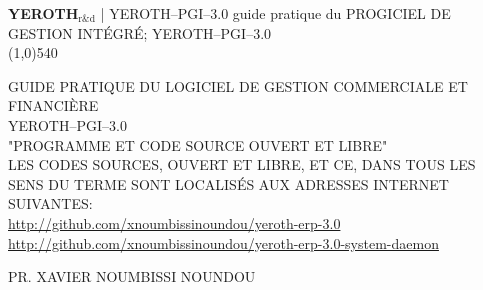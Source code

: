 \documentclass[a4paper, 12pt]{report}
\newcommand{\yerothrd}{\textcolor{yerothColorGreen}
			{\textsc{\textcolor{yerothColorRed}{YEROTH}}$_{\text{r\&d}}$\xspace}}
\newcommand{\yerothpgiblack}{YEROTH--PGI--$3.0$\xspace}
\newcommand{\yerothpgi}{\textsc{\textcolor{yerothColorBlue}{YEROTH--PGI--$3.0$}}\xspace}
\newcommand{\myfullacademicname}{PR. XAVIER NOUMBISSI NOUNDOU\xspace}
\begin{document}
\thispagestyle{OnlyFirstPage}

{\bf \Large \yerothrd} {| \sc \scriptsize \yerothpgiblack guide pratique du PROGICIEL
							DE GESTION INTÉGRÉ; YEROTH--PGI--3.0}
\\ \line(1,0){540}

\vspace{2.0em}

\begin{center}
{\LARGE
GUIDE PRATIQUE DU LOGICIEL DE GESTION COMMERCIALE ET FINANCI\`ERE\\
 \yerothpgi \\
\vspace{4.0em}
"PROGRAMME ET CODE SOURCE OUVERT ET LIBRE"\\
\vspace{2.0em}
LES CODES SOURCES, OUVERT ET LIBRE, ET CE, DANS TOUS LES SENS DU TERME
SONT LOCALIS\'ES AUX ADRESSES INTERNET SUIVANTES:\\
\vspace{1.0em}
{\small \url{http://github.com/xnoumbissinoundou/yeroth-erp-3.0}}\\
{\small \url{http://github.com/xnoumbissinoundou/yeroth-erp-3.0-system-daemon}}
}
\end{center}

\vspace{4.0em}

\begin{center}
{\large \myfullacademicname}
\end{center}

\vspace{4.0em}



\begingroup
\tableofcontents
\endgroup

\begingroup
\color{medgreen}
\listoffigures
\endgroup

\begingroup
\color{medgreen}
\listoftables
\endgroup

\cleardoublepage







%
%

\cleardoublepage
{}
\printindex

\cleardoublepage
{}
{}

\appendix



\newpage


\end{document}
